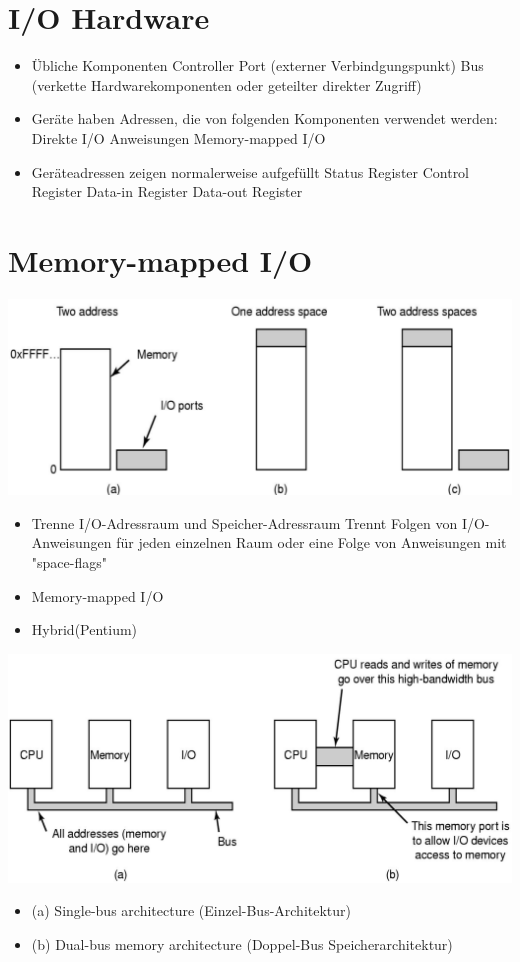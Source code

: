 \documentclass[a4paper]{scrreprt}
\begin{document}
\section{I/O Hardware}
\begin{itemize}
	\item Übliche Komponenten
		\subitem Controller
		\subitem Port (externer Verbindgungspunkt)
		\subitem Bus (verkette Hardwarekomponenten oder geteilter direkter Zugriff)
	\item Geräte haben Adressen, die von folgenden Komponenten verwendet werden:
		\subitem Direkte I/O Anweisungen 
		\subitem Memory-mapped I/O
	\item Geräteadressen zeigen normalerweise aufgefüllt	
		\subitem Status Register
		\subitem Control Register
		\subitem Data-in Register
		\subitem Data-out Register
\end{itemize}
\section{Memory-mapped I/O}
\includegraphics[scale=0.5]{graphics/chapter9_2.png}
\begin{itemize}
	\item Trenne I/O-Adressraum und Speicher-Adressraum
		\subitem Trennt Folgen von I/O-Anweisungen für jeden einzelnen Raum
		\subitem oder eine Folge von Anweisungen mit "space-flags"
	\item Memory-mapped I/O
	\item Hybrid(Pentium)
\end{itemize}
\includegraphics[scale=0.25]{graphics/chapter9_3.png}
\begin{itemize}
\item (a) Single-bus architecture (Einzel-Bus-Architektur)
\item (b) Dual-bus memory architecture (Doppel-Bus Speicherarchitektur)
\end{itemize}
\end{document}
